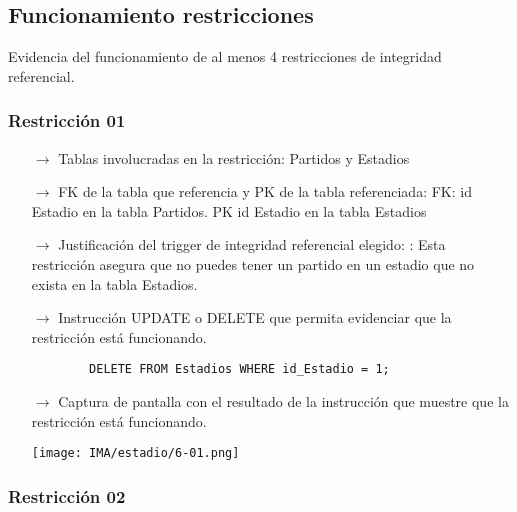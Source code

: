 \subsection{Funcionamiento restricciones}

Evidencia del funcionamiento de al menos 4 restricciones de integridad referencial.

\subsubsection*{Restricción 01}

\begin{itemize}
    \item[$\rightarrow$] Tablas involucradas en la restricción: Partidos y Estadios
    \item[$\rightarrow$] FK de la tabla que referencia y PK de la tabla referenciada: FK: id Estadio en la tabla Partidos. PK id Estadio en la tabla Estadios
    \item[$\rightarrow$] Justificación del trigger de integridad referencial elegido: : Esta restricción asegura que no puedes tener un partido en un estadio que no exista en la tabla Estadios.
    \item[$\rightarrow$] Instrucción UPDATE o DELETE que permita evidenciar que la restricción está
    funcionando.
    \begin{verbatim}
        DELETE FROM Estadios WHERE id_Estadio = 1;
    \end{verbatim}
    \item[$\rightarrow$] Captura de pantalla con el resultado de la instrucción que muestre que la restricción está
    funcionando.
    \begin{center}
        \texttt{[image: IMA/estadio/6-01.png]}
    \end{center}
\end{itemize}


\subsubsection*{Restricción 02}

